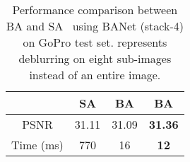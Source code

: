 \begin{table}[t!]
\centering
\setlength{\tabcolsep}{7mm}
\caption{Performance comparison between BA and SA~\cite{SAGAN_2019_PMLR} using BANet (stack-4) on GoPro test set.  represents deblurring on eight sub-images instead of an entire image.}
\begin{tabular}{cccc}\\\hline
    & SA & BA & BA  \\\hline
    PSNR &  31.11  & 31.09 & \bf31.36    \\
    Time (ms)  & 770 & 16 & \bf12 \\\hline   
\end{tabular}
\label{tab:SA_vs_BA}
\end{table}






